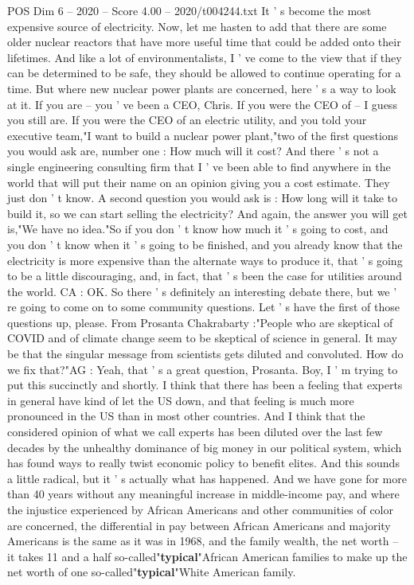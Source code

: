 \begin{textsample}{POS Dim 6 – 2020 – Score 4.00 – 2020/t004244.txt}
It ' s become the most expensive source of electricity.
Now, let me hasten to add that there are some older nuclear reactors that have more useful time that could be added onto their lifetimes.
And like a lot of environmentalists, I ' ve come to the view that if they can be determined to be safe, they should be allowed to continue operating for a time.
But where new nuclear power plants are concerned, here ' s a way to look at it.
If you are -- you ' ve been a CEO, Chris.
If you were the CEO of -- I guess you still are.
If you were the CEO of an electric utility, and you told your executive team,"I want to build a nuclear power plant,"two of the first questions you would ask are, number one : How much will it cost?
And there ' s not a single engineering consulting firm that I ' ve been able to find anywhere in the world that will put their name on an opinion giving you a cost estimate.
They just don ' t know.
A second question you would ask is : How long will it take to build it, so we can start selling the electricity?
And again, the answer you will get is,"We have no idea."So if you don ' t know how much it ' s going to cost, and you don ' t know when it ' s going to be finished, and you already know that the electricity is more expensive than the alternate ways to produce it, that ' s going to be a little discouraging, and, in fact, that ' s been the case for utilities around the world.
CA : OK.
So there ' s definitely an interesting debate there, but we ' re going to come on to some community questions.
Let ' s have the first of those questions up, please.
From Prosanta Chakrabarty :"People who are skeptical of COVID and of climate change seem to be skeptical of science in general.
It may be that the singular message from scientists gets diluted and convoluted.
How do we fix that?"AG : Yeah, that ' s a great question, Prosanta.
Boy, I ' m trying to put this succinctly and shortly.
I think that there has been a feeling that experts in general have kind of let the US down, and that feeling is much more pronounced in the US than in most other countries.
And I think that the considered opinion of what we call experts has been diluted over the last few decades by the unhealthy dominance of big money in our political system, which has found ways to really twist economic policy to benefit elites.
And this sounds a little radical, but it ' s actually what has happened.
And we have gone for more than 40 years without any meaningful increase in middle-income pay, and where the injustice experienced by African Americans and other communities of color are concerned, the differential in pay between African Americans and majority Americans is the same as it was in 1968, and the family wealth, the net worth -- it takes 11 and a half so-called"\textbf{typical}"African American families to make up the net worth of one so-called"\textbf{typical}"White American family.

\end{textsample}
